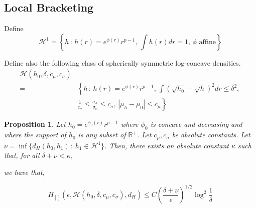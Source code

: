 \documentclass[12pt]{article}
\newtheorem{proposition}[theorem]{Proposition}
\begin{document}
\subsection{Local Bracketing}
 

Define
\[
  \mathcal{H}^1 = \left\{ h \,:\, h(r) = e^{\phi(r)} r^{p-1},\, \int h(r) dr = 1,\, \phi \textrm{ affine} \right\}
\]

Define also the following class of spherically symmetric log-concave densities. 
\begin{align}
  \mathcal{H}(h_0, \delta, c_\mu, c_\sigma)& \\
  =& \left\{ h \,:\, h(r) = e^{\phi(r)} r^{p-1},\, \int \left( \sqrt{h_0} - \sqrt{h} \right)^2 dr \leq \delta^2,\, \right.\\
  & \left. \frac{1}{c_\sigma} \leq \frac{\sigma_h}{\sigma_0} \leq c_\sigma,\,
  |\mu_h - \mu_0 | \leq c_\mu \right\}
\end{align}
  

\begin{proposition}
  Let $h_0 = e^{\phi_0(r)} r^{p-1}$ where $\phi_0$ is concave and decreasing and where the support of $h_0$ is any subset of $\mathbb{R}^+$. Let $c_\mu, c_\sigma$ be absolute constants. Let $\nu = \inf \{ d_H(h_0, h_1) \,:\, h_1 \in \mathcal{H}^1 \}$. Then, there exists an absolute constant $\kappa$ such that, for all $\delta + \nu < \kappa$, 

  we have that,

  \[
    H_{[]}(\epsilon, \mathcal{H}(h_0, \delta, c_\mu, c_\sigma), d_H) \leq
    C \left( \frac{\delta + \nu}{\epsilon} \right)^{1/2} \log^2 \frac{1}{\delta}
  \]
  
\end{proposition}
\end{document}
